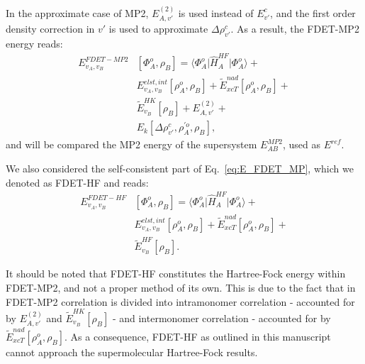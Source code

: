 \documentclass[journal=jctcce,manuscript=article, layout=twocolumn]{achemso}
\begin{document}
In the approximate case of MP2, $E^{(2)}_{A,v'}$ is used instead of $E^c_{v'}$, and the first order density correction in $v'$ is used to approximate  $\Delta \rho^c_{v'}$.
As a result, the FDET-MP2 energy reads:
\begin{align} \label{eq:E_FDET_MP}
 E_{v_A,v_B}^{FDET-MP2} & [\Phi_{A}^{o},\rho_B] =  \langle\Phi^{o}_{A}\vert \hat{H}^{HF}_A\vert \Phi^{o}_{A}\rangle + \\ \nonumber
& E^{elst,int}_{v_A,v_B}[\rho^{o}_A,\rho_B] + \tilde{E}_{xcT}^{nad}[\rho^{o}_A,\rho_B] + \\ \nonumber
& \tilde{E}^{HK}_{v_B}[\rho_B] + E^{(2)}_{A,v'} + \\ \nonumber 
& E_k[\Delta \rho^c_{v'}, \rho^{'o}_A, \rho_B],
\end{align}
and will be compared the MP2 energy of the supersystem $E^{MP2}_{AB}$, used as $E^{ref}$.

We also considered the self-consistent part of Eq.~\ref{eq:E_FDET_MP}, which we denoted as FDET-HF and reads:
\begin{align} \label{eq:E_FDET_HF}
 E_{v_A,v_B}^{FDET-HF} & [\Phi_{A}^{o},\rho_B] =  \langle\Phi^{o}_{A}\vert \hat{H}^{HF}_A\vert \Phi^{o}_{A}\rangle + \\ \nonumber
& E^{elst,int}_{v_A,v_B}[\rho^{o}_A,\rho_B] + \tilde{E}_{xcT}^{nad}[\rho^{o}_A,\rho_B] + \\ \nonumber
& \tilde{E}^{HF}_{v_B}[\rho_B].
\end{align}

It should be noted that FDET-HF constitutes the Hartree-Fock energy within FDET-MP2, and not a proper method of its own. This is due to the fact that in FDET-MP2 correlation is divided into intramonomer correlation - accounted for by $E^{(2)}_{A,v'}$ and $\tilde{E}^{HK}_{v_B}[\rho_B]$ - and intermonomer correlation - accounted for by $\tilde{E}_{xcT}^{nad}[\rho^{o}_A,\rho_B]$. As a consequence, FDET-HF as outlined in this manuscript cannot approach the supermolecular Hartree-Fock results.
 
\end{document}
